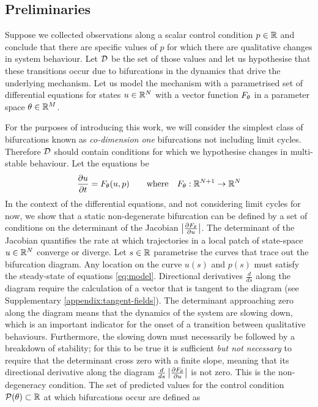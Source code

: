 \documentclass{article}
\begin{document}
\subsection{Preliminaries}

Suppose we collected observations along a scalar control condition $p\in\mathbb{R}$ and conclude that there are specific values of $p$ for which there are qualitative changes in system behaviour. Let $\mathcal{D}$ be the set of those values and let us hypothesise that these transitions occur due to bifurcations in the dynamics that drive the underlying mechanism. Let us model the mechanism with a parametrised set of differential equations for states $u\in\mathbb{R}^N$ with a vector function $F_{\theta}$ in a parameter space $\theta\in\mathbb{R}^M$.

For the purposes of introducing this work, we will consider the simplest class of bifurcations known as \textit{co-dimension one} bifurcations not including limit cycles. Therefore $\mathcal{D}$ should contain conditions for which we hypothesise changes in multi-stable behaviour. Let the equations be
\begin{align}
	\frac{\partial u}{\partial t}=F_{\theta}(u,p)
	\qquad\mathrm{where}\quad
	F_{\theta} : \mathbb{R}^{N+1}\rightarrow\mathbb{R}^N
	\label{eq:model}
\end{align}
In the context of the differential equations, and not considering limit cycles for now, we show that a static non-degenerate bifurcation can be defined by a set of conditions on the determinant of the Jacobian $\left| \frac{\partial F_{\theta}}{\partial u} \right|$. The determinant of the Jacobian quantifies the rate at which trajectories in a local patch of state-space $u\in\mathbb{R}^N$ converge or diverge. Let $s\in\mathbb{R}$ parametrise the curves that trace out the bifurcation diagram. Any location on the curve $u(s)$ and $p(s)$ must satisfy the steady-state of equations \eqref{eq:model}. Directional derivatives $\frac{d}{ds}$ along the diagram require the calculation of a vector that is tangent to the diagram (see Supplementary \ref{appendix:tangent-fields}). The determinant approaching zero along the diagram means that the dynamics of the system are slowing down, which is an important indicator for the onset of a transition between qualitative behaviours. Furthermore, the slowing down must necessarily be followed by a breakdown of stability; for this to be true it is sufficient \textit{but not necessary} to require that the determinant cross zero with a finite slope, meaning that its directional derivative along the diagram $\frac{d}{ds}\left| \frac{\partial F_{\theta}}{\partial u} \right|$ is not zero. This is the non-degeneracy condition. The set of predicted values for the control condition $\mathcal{P}(\theta)\subset\mathbb{R}$ at which bifurcations occur are defined as
\end{document}
